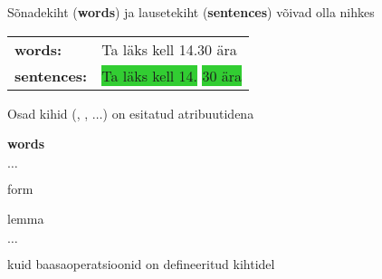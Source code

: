 \documentclass[landscape,footrule]{foils}
\begin{document}
\begin{triangles}
\item Sõnadekiht (\textbf{words}) ja lausetekiht (\textbf{sentences}) võivad olla nihkes \\

\hspace*{3cm}
\begin{tabular}{ll}
\textbf{words:}&
{\setlength{\fboxsep}{3pt}
\colorbox{Apricot}{Ta} \colorbox{Apricot}{läks} \colorbox{Apricot}{kell} \colorbox{Apricot}{14\hspace*{5pt}.\hspace*{5pt}30} 
\colorbox{Apricot}{ära}}\\
\textbf{sentences:} &
{\setlength{\fboxsep}{3pt}
\colorbox{LimeGreen}{Ta\hspace*{6pt} läks\hspace*{6pt} kell\hspace*{6pt} 14.} \colorbox{LimeGreen}{30 \hspace*{3pt}ära} }\\
\end{tabular}\vspace*{2ex}


\item Osad kihid (, , $\ldots$) on esitatud atribuutidena \\ 

\hspace*{3.5cm}
\begin{minipage}{10cm} 
\begin{triangles}
\item \textbf{words} \vspace*{0.5ex} 
\begin{triangles}
\item {} \vspace*{0.5ex}
\begin{diamonds}
\item $\ldots$
\item form
\item  lemma
\item $\ldots$\vspace*{1ex}
\end{diamonds} 
\end{triangles}
\end{triangles}
\end{minipage}
\vspace*{1.5cm} 

kuid baasaoperatsioonid on defineeritud kihtidel  

\end{triangles}
\end{document}
